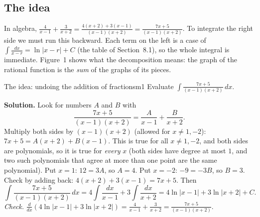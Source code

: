 \documentclass[11pt]{article}
\begin{document}
\subsection*{The idea}

In algebra, $\frac4{x-1}+\frac3{x+2}=\frac{4(x+2)+3(x-1)}{(x-1)(x+2)}=\frac{7x+5}{(x-1)(x+2)}$. To integrate the right side we must run this backward. Each term on the left is a case of $\int\frac{dx}{x-r}=\ln\lvert x-r\rvert+C$ (the table of Section~8.1), so the whole integral is immediate. Figure~1 shows what the decomposition means: the graph of the rational function is the \emph{sum} of the graphs of its pieces.

\begin{exmp}{The idea: undoing the addition of fractions}{m1}
Evaluate $\displaystyle\int\frac{7x+5}{(x-1)(x+2)}\,dx$.

\textbf{Solution.} Look for numbers $A$ and $B$ with
\[\frac{7x+5}{(x-1)(x+2)}=\frac A{x-1}+\frac B{x+2}.\]
Multiply both sides by $(x-1)(x+2)$ (allowed for $x\ne1,-2$): $7x+5=A(x+2)+B(x-1)$. This is true for all $x\ne1,-2$, and both sides are polynomials, so it is true for \emph{every} $x$ (both sides have degree at most $1$, and two such polynomials that agree at more than one point are the same polynomial). Put $x=1$: $12=3A$, so $A=4$. Put $x=-2$: $-9=-3B$, so $B=3$. Check by adding back: $4(x+2)+3(x-1)=7x+5$. Then
\[\int\frac{7x+5}{(x-1)(x+2)}\,dx=4\int\frac{dx}{x-1}+3\int\frac{dx}{x+2}=4\ln\lvert x-1\rvert+3\ln\lvert x+2\rvert+C .\]
\emph{Check.} $\frac d{dx}\left(4\ln\lvert x-1\rvert+3\ln\lvert x+2\rvert\right)=\frac4{x-1}+\frac3{x+2}=\frac{7x+5}{(x-1)(x+2)}$.


\end{exmp}
\end{document}
